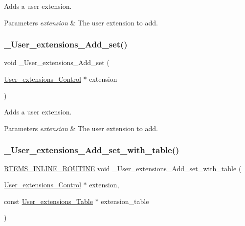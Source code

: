 Adds a user extension. 


\begin{DoxyParams}{Parameters}
{\em extension} & The user extension to add. \\
\hline
\end{DoxyParams}
\mbox{\label{group__RTEMSScoreUserExt_gafdc6f52aa40887a25007f2c57a133a14}} 
\subsubsection{\texorpdfstring{\_User\_extensions\_Add\_set()}{\_User\_extensions\_Add\_set()}}
{\footnotesize\ttfamily void \+\_\+\+User\+\_\+extensions\+\_\+\+Add\+\_\+set (\begin{DoxyParamCaption}\item[{\mbox{\hyperlink{structUser__extensions__Control}{User\+\_\+extensions\+\_\+\+Control}} $\ast$}]{extension }\end{DoxyParamCaption})}



Adds a user extension. 


\begin{DoxyParams}{Parameters}
{\em extension} & The user extension to add. \\
\hline
\end{DoxyParams}
\mbox{\label{group__RTEMSScoreUserExt_gaa59ba5ba0d79eb8b04a9987c5323b29a}} 
\subsubsection{\texorpdfstring{\_User\_extensions\_Add\_set\_with\_table()}{\_User\_extensions\_Add\_set\_with\_table()}}
{\footnotesize\ttfamily \mbox{\hyperlink{group__RTEMSScoreBaseDefs_gac216239df231d5dbd15e3520b0b9313f}{R\+T\+E\+M\+S\+\_\+\+I\+N\+L\+I\+N\+E\+\_\+\+R\+O\+U\+T\+I\+NE}} void \+\_\+\+User\+\_\+extensions\+\_\+\+Add\+\_\+set\+\_\+with\+\_\+table (\begin{DoxyParamCaption}\item[{\mbox{\hyperlink{structUser__extensions__Control}{User\+\_\+extensions\+\_\+\+Control}} $\ast$}]{extension,  }\item[{const \mbox{\hyperlink{structUser__extensions__Table}{User\+\_\+extensions\+\_\+\+Table}} $\ast$}]{extension\+\_\+table }\end{DoxyParamCaption})}



